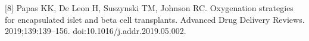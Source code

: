\documentclass[11pt]{article}
\begin{document}
\begin{minipage}{\linewidth}
\par\noindent\begin{minipage}{\linewidth}\small [8] Papas KK, De Leon H, Suszynski TM, Johnson RC. Oxygenation strategies for encapsulated islet and beta cell transplants. Advanced Drug Delivery Reviews. 2019;139:139--156. doi:10.1016/j.addr.2019.05.002.\end{minipage}\par\vspace{2pt}

\end{minipage}
\end{document}
